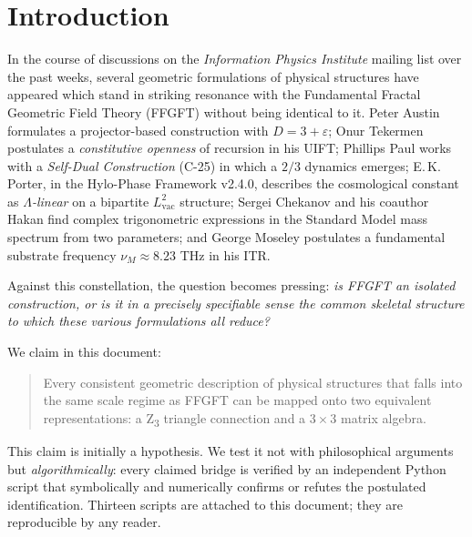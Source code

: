 
\section{Introduction}
\label{sec:intro}

In the course of discussions on the \emph{Information Physics Institute} mailing list over the past weeks, several geometric formulations of physical structures have appeared which stand in striking resonance with the Fundamental Fractal Geometric Field Theory (FFGFT) without being identical to it. Peter Austin formulates a projector-based construction with \(D = 3 + \varepsilon\); Onur Tekermen postulates a \emph{constitutive openness} of recursion in his UIFT; Phillips Paul works with a \emph{Self-Dual Construction} (C-25) in which a \(2/3\) dynamics emerges; E.\,K.\,Porter, in the Hylo-Phase Framework v2.4.0, describes the cosmological constant as \emph{\(\Lambda\)-linear} on a bipartite \(L_\text{vac}^2\) structure; Sergei Chekanov and his coauthor Hakan find complex trigonometric expressions in the Standard Model mass spectrum from two parameters; and George Moseley postulates a fundamental substrate frequency \(\nu_M \approx 8.23\) THz in his ITR.

Against this constellation, the question becomes pressing: \emph{is FFGFT an isolated construction, or is it in a precisely specifiable sense the common skeletal structure to which these various formulations all reduce?}

We claim in this document:
\begin{quote}
Every consistent geometric description of physical structures that falls into the same scale regime as FFGFT can be mapped onto two equivalent representations: a Z\textsubscript{3} triangle connection and a 3\,$\times$\,3 matrix algebra.
\end{quote}

This claim is initially a hypothesis. We test it not with philosophical arguments but \emph{algorithmically}: every claimed bridge is verified by an independent Python script that symbolically and numerically confirms or refutes the postulated identification. Thirteen scripts are attached to this document; they are reproducible by any reader.

